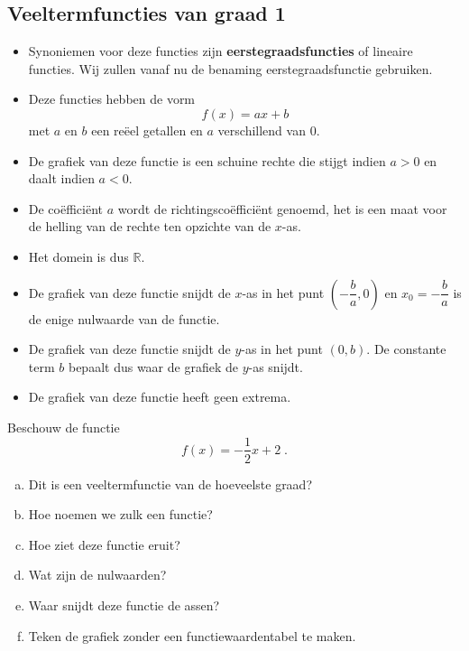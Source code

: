\documentclass[12pt]{article}
\begin{document}
\pagebreak
\subsection{Veeltermfuncties van graad 1}

\begin{itemize}
  \item Synoniemen voor deze functies zijn {\bf eerstegraadsfuncties} of lineaire functies. Wij zullen vanaf nu de benaming eerstegraadsfunctie gebruiken.
  \item Deze functies hebben de vorm
  $$f(x) = ax+b $$
  met $a$ en $b$ een reëel getallen en $a$ verschillend van $0$.
  \item De grafiek van deze functie is een schuine rechte die stijgt indien $a > 0$ en daalt indien $a<0$.
    \item De coëfficiënt $a$ wordt de richtingscoëfficiënt genoemd, het is een maat voor de helling van de rechte ten opzichte van de $x$-as.
  \item Het domein is dus $\mathbb{R}$.
  \item De grafiek van deze functie snijdt de $x$-as in het punt $(-\dfrac{b}{a}, 0)$ en $x_0=-\dfrac{b}{a}$ is de enige nulwaarde van de functie.
  \item De grafiek van deze functie snijdt de $y$-as in het punt $(0, b)$. De constante term $b$ bepaalt dus waar de grafiek de $y$-as snijdt.
  \item De grafiek van deze functie heeft geen extrema.
\end{itemize}

\begin{oefening}
Beschouw de functie 
$$f(x)=-\dfrac{1}{2}x+2\;.$$
\begin{enumerate}[(a)]
  \item Dit is een veeltermfunctie van de hoeveelste graad?
  \item Hoe noemen we zulk een functie?
  \item Hoe ziet deze functie eruit?
  \item Wat zijn de nulwaarden?
  \item Waar snijdt deze functie de assen?
  \item Teken de grafiek zonder een functiewaardentabel te maken.
\end{enumerate}
\end{oefening}
\end{document}
